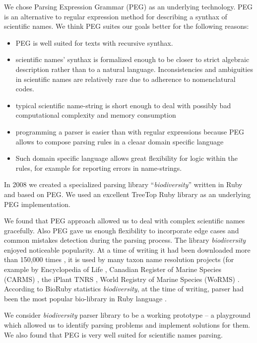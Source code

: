 \documentclass{bmcart}
\begin{document}
We chose Parsing Expression Grammar (PEG) \cite{Ford2004} as an underlying
technology. PEG is an alternative to regular expression method for describing a
synthax of scientific names. We think PEG suites our goals better for the
following reasons:

\begin{itemize}
  \item PEG is well suited for texts with recursive synthax.
  \item scientific names' synthax is formalized enough to be closer to strict
  algebraic description rather than to a natural language. Inconsistencies and
  ambiguities in scientific names are relatively rare due to adherence to
  nomenclatural codes.
  \item typical scientific name-string is short enough to deal with
  possibly bad computational complexity and memory consumption
  \item programming a parser is easier than with regular
    expressions because PEG allows to compose parsing rules in a cleaar domain
    specific language
  \item Such domain specific language allows great flexibility for logic within
    the rules, for example for reporting errors in name-strings.
\end{itemize}

In 2008 we created a specialized parsing library ``\textit{biodiversity}''
\cite{biodiversity} written in Ruby and based on PEG. We used an excellent
TreeTop Ruby library \cite{treetop} as an underlying PEG implementation.

We found that PEG approach allowed us to deal with complex scientific names
gracefully. Also PEG gave us enough flexibility to incorporate edge cases and
common mistakes detection during the parsing process. The library
\textit{biodiversity} enjoyed noticeable popularity. At a time of writing it
had been downloaded more than 150,000 times \cite{bdiv-downloads}, it is used
by many taxon name resolution projects (for example by Encyclopedia of Life
\cite{eol}, Canadian Register of Marine Species (CARMS) \cite{carms}, the
iPlant TNRS \cite{iplant}, World Registry of Marine Species (WoRMS)
\cite{worms}.  According to BioRuby statistics \textit{biodiversity}, at the
time of writing, parser had been the most popular bio-library in Ruby language
\cite{biogems}.

We consider \textit{biodiversity} parser library to be a working prototype -- a
playground which allowed us to identify parsing problems and implement
solutions for them. We also found that PEG is very well suited for scientific
names parsing.
\end{document}
